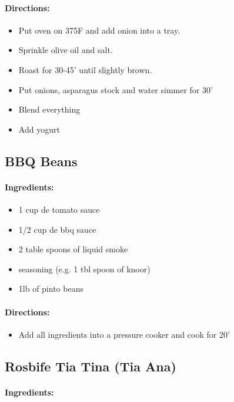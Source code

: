 \documentclass{article}
\begin{document}
\paragraph{Directions:}
\begin{itemize}
	\item Put oven on 375F and add onion into a tray.
	\item Sprinkle olive oil and salt.
	\item Roast for 30-45' until slightly brown.
	\item Put onions, asparagus stock and water simmer for 30'
	\item Blend everything
	\item Add yogurt
\end{itemize}

\subsection{BBQ Beans}

\paragraph{Ingredients:}

\begin{itemize}
	\item 1 cup de tomato sauce
	\item 1/2 cup de bbq sauce
	\item 2 table spoons of liquid smoke
	\item seasoning (e.g. 1 tbl spoon of knoor)
	\item 1lb of pinto beans
\end{itemize}

\paragraph{Directions:}
\begin{itemize}
	\item Add all ingredients into a pressure cooker and cook for 20'
\end{itemize}

\subsection{Rosbife Tia Tina (Tia Ana)}

\paragraph{Ingredients:}
\end{document}
